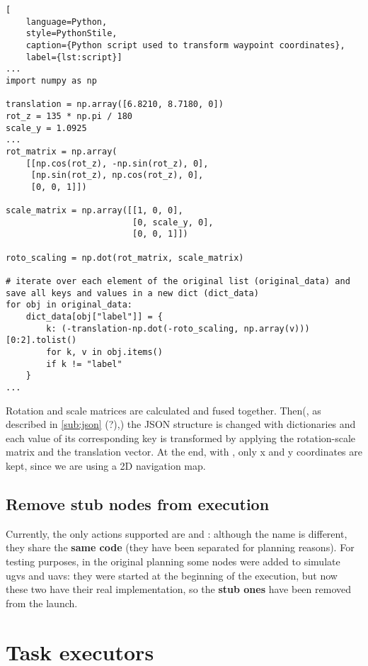 \applymulticoltrue

\noindent\begin{lstlisting}[
    language=Python,
    style=PythonStile,
    caption={Python script used to transform waypoint coordinates},
    label={lst:script}]
...
import numpy as np

translation = np.array([6.8210, 8.7180, 0])
rot_z = 135 * np.pi / 180
scale_y = 1.0925
...
rot_matrix = np.array(
    [[np.cos(rot_z), -np.sin(rot_z), 0],
     [np.sin(rot_z), np.cos(rot_z), 0],
     [0, 0, 1]])

scale_matrix = np.array([[1, 0, 0], 
                         [0, scale_y, 0],
                         [0, 0, 1]])

roto_scaling = np.dot(rot_matrix, scale_matrix)

# iterate over each element of the original list (original_data) and save all keys and values in a new dict (dict_data)
for obj in original_data:
    dict_data[obj["label"]] = {
        k: (-translation-np.dot(-roto_scaling, np.array(v)))[0:2].tolist()
        for k, v in obj.items()
        if k != "label"
    }
...
\end{lstlisting}

\applymulticolfalse

Rotation and scale matrices are calculated and fused together. Then(, as described in \autoref{sub:json} (?),) the JSON structure is changed with dictionaries and each value of its corresponding key is transformed by applying the rotation-scale matrix and the translation vector. At the end, with \code{[0:2]}, only x and y coordinates are kept, since we are using a 2D navigation map.

\subsection{Remove stub nodes from execution}

Currently, the only actions supported are  and : although the name is different, they share the \textbf{same code} (they have been separated for planning reasons). For testing purposes, in the original planning some nodes were added to simulate \acrshort{ugvs} and \acrshort{uavs}: they were started at the beginning of the execution, but now these two have their real implementation, so the \textbf{stub ones} have been removed from the launch.

\section{Task executors}

